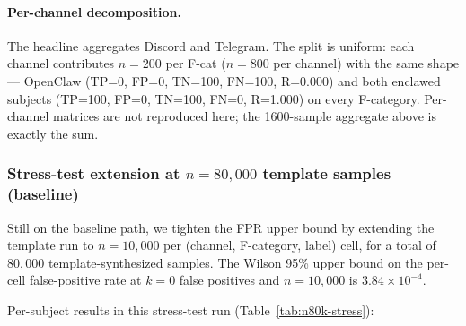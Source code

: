 \documentclass[11pt]{article}
\begin{document}
\paragraph{Per-channel decomposition.} The headline aggregates Discord
and Telegram. The split is uniform: each channel contributes
$n=200$ per F-cat ($n=800$ per channel) with the same shape ---
OpenClaw (TP=0, FP=0, TN=100, FN=100, R=0.000) and both enclawed
subjects (TP=100, FP=0, TN=100, FN=0, R=1.000) on every F-category.
Per-channel matrices are not reproduced here; the 1600-sample
aggregate above is exactly the sum.

\subsubsection{Stress-test extension at $n = 80{,}000$ template samples
(baseline)}

Still on the baseline path, we tighten the FPR upper bound by extending the
template run to $n = 10{,}000$ per (channel, F-category, label) cell, for a
total of $80{,}000$ template-synthesized samples. The Wilson 95\% upper
bound on the per-cell false-positive rate at $k = 0$ false positives and
$n = 10{,}000$ is $3.84 \times 10^{-4}$.

Per-subject results in this stress-test run
(Table~\ref{tab:n80k-stress}):
\end{document}
